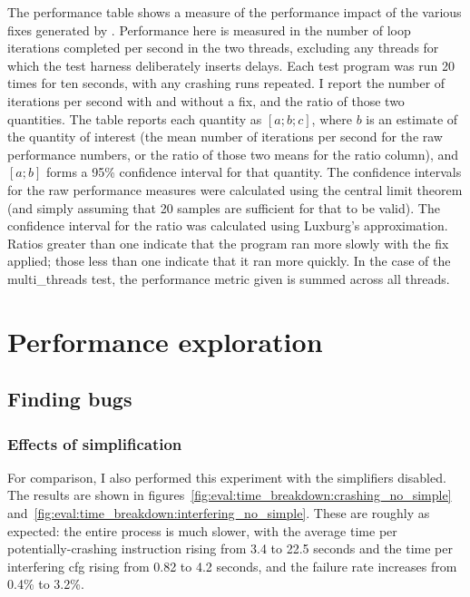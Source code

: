 The performance table shows a measure of the performance impact of the
various fixes generated by {\technique}.  Performance here is measured
in the number of loop iterations completed per second in the two
threads, excluding any threads for which the test harness deliberately
inserts delays.  Each test program was run 20 times for ten seconds,
with any crashing runs repeated.  I report the number of iterations
per second with and without a fix, and the ratio of those two
quantities.  The table reports each quantity as $[a; b; c]$, where $b$
is an estimate of the quantity of interest (the mean number of
iterations per second for the raw performance numbers, or the ratio of
those two means for the ratio column), and $[a;b]$ forms a 95\%
confidence interval for that quantity.  The confidence intervals for
the raw performance measures were calculated using the central limit
theorem (and simply assuming that 20 samples are sufficient for that
to be valid).  The confidence interval for the ratio was calculated
using Luxburg's approximation\needCite{}.  Ratios greater than one
indicate that the program ran more slowly with the fix applied; those
less than one indicate that it ran more quickly.  In the case of the
multi\_threads test, the performance metric given is summed across all
threads.


\section{Performance exploration}
\label{sect:eval:time_details}

\subsection{Finding bugs}

\subsubsection{Effects of {\StateMachine} simplification}

For comparison, I also performed this experiment with the
{\StateMachine} simplifiers disabled.  The results are shown in
figures~\ref{fig:eval:time_breakdown:crashing_no_simple}
and~\ref{fig:eval:time_breakdown:interfering_no_simple}.  These are
roughly as expected: the entire process is much slower, with the
average time per potentially-crashing instruction rising from 3.4 to
22.5 seconds and the time per interfering \gls{cfg} rising from 0.82
to 4.2 seconds, and the failure rate increases from 0.4\% to 3.2\%.


